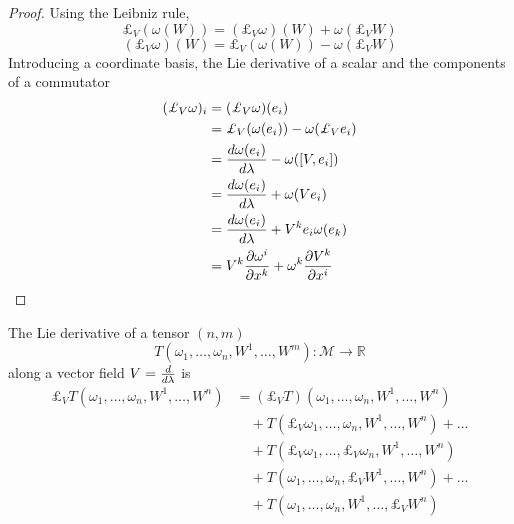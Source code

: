     \begin{proof}
        Using the Leibniz rule,
        \begin{equation*}
            \pounds_V (\omega (W)) = (\pounds_V \omega) (W) + \omega  (\pounds_V W)
        \end{equation*}
        \begin{equation*}
             (\pounds_V \omega) (W) = \pounds_V (\omega (W)) - \omega  (\pounds_V W)
        \end{equation*}
        Introducing a coordinate basis, the Lie derivative of a scalar and the components of a commutator
        \begin{equation*}
        \begin{aligned}
            (\pounds_V \omega)_i & = (\pounds_V \omega )(e_i) \\ & = \pounds_V (\omega (e_i)) - \omega  (\pounds_V e_i) \\ & = \dv{\omega (e_i)}{\lambda} - \omega ([V, e_i]) \\ & = \dv{\omega (e_i)}{\lambda} + \omega(V e_i) \\ & =  \dv{\omega (e_i)}{\lambda} + V^k e_i \omega(e_k) \\ & = V^k \pdv{\omega^i}{x^k} + \omega^k \pdv{V^k}{x^i}
        \end{aligned}
        \end{equation*}
    \end{proof}

    \begin{definition}
        The Lie derivative of a tensor $(n,m)$
        \begin{equation*}
            T (\omega_1, \ldots, \omega_n, W^1, \ldots, W^m) \colon \mathcal M \rightarrow \mathbb R
        \end{equation*} 
        along a vector field $V=\frac{d}{d\lambda}$ is
        \begin{equation*}
        \begin{aligned}
            \pounds_V T (\omega_1, \ldots, \omega_n, W^1, \ldots, W^n) & = (\pounds_V T) (\omega_1, \ldots, \omega_n, W^1, \ldots, W^n) \\ & \quad + T (\pounds_V \omega_1, \ldots, \omega_n, W^1, \ldots, W^n) + \ldots \\ & \quad + T (\pounds_V \omega_1, \ldots, \pounds_V \omega_n, W^1, \ldots, W^n) \\ & \quad + T (\omega_1, \ldots, \omega_n, \pounds_V W^1, \ldots, W^n) + \ldots \\ & \quad + T (\omega_1, \ldots, \omega_n, W^1, \ldots, \pounds_V W^n)
        \end{aligned}
        \end{equation*}
    \end{definition}

